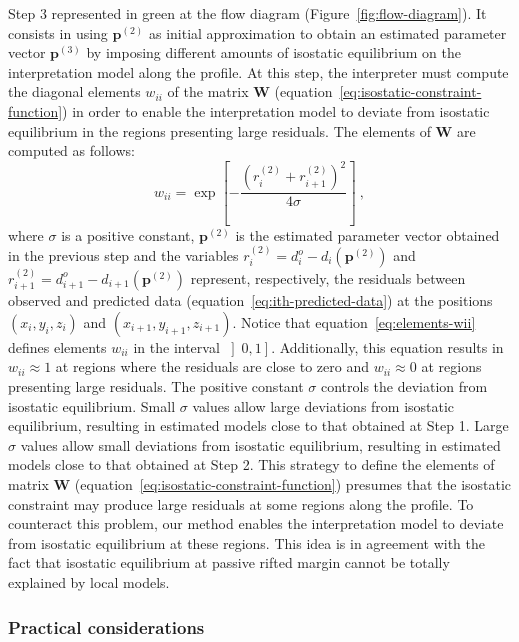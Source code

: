 \documentclass[manuscript]{geophysics}
\begin{document}
Step 3 represented in green at the flow diagram (Figure~\ref{fig:flow-diagram}). 
It consists in using $\mathbf{p}^{(2)}$ as initial 
approximation to obtain an estimated parameter vector $\mathbf{p}^{(3)}$
by imposing different amounts of isostatic equilibrium on the interpretation model along the
profile. At this step, the interpreter must compute the diagonal elements 
$w_{ii}$ of the matrix $\mathbf{W}$ (equation~\ref{eq:isostatic-constraint-function}) 
in order to enable the interpretation model to deviate from isostatic equilibrium in 
the regions presenting large residuals. 
The elements of $\mathbf{W}$ are computed as follows:
\begin{equation} \label{eq:elements-wii}
w_{ii} = 
\exp \left[ - \frac{ \left( r_{i}^{(2)} + r_{i+1}^{(2)} \right)^{2}}{4 \sigma} \right] \: ,
\end{equation}
where $\sigma$ is a positive constant, $\mathbf{p}^{(2)}$ is the estimated parameter vector
obtained in the previous step and the variables
$r_{i}^{(2)} = d^{o}_{i} - d_{i} \left( \mathbf{p}^{(2)} \right)$ and 
$r_{i+1}^{(2)} = d^{o}_{i+1} - d_{i+1} \left(\mathbf{p}^{(2)} \right)$ represent,
respectively, the residuals between observed and predicted data
(equation~\ref{eq:ith-predicted-data}) at the positions $(x_{i}, y_{i}, z_{i})$ and 
$(x_{i+1}, y_{i+1}, z_{i+1})$. Notice that equation~\ref{eq:elements-wii} defines elements 
$w_{ii}$ in the interval $\left] 0, 1 \right]$. Additionally, this equation results in 
$w_{ii} \approx 1$ at regions where the residuals are close to zero and 
$w_{ii} \approx 0$ at regions presenting large residuals.
The positive constant $\sigma$ controls the deviation from isostatic equilibrium.
Small $\sigma$ values allow large deviations from isostatic equilibrium,
resulting in estimated models close to that obtained at Step 1.
Large $\sigma$ values allow small deviations from isostatic equilibrium,
resulting in estimated models close to that obtained at Step 2.
This strategy to define the elements of matrix $\mathbf{W}$ 
(equation~\ref{eq:isostatic-constraint-function}) presumes that the isostatic constraint may
produce large residuals at some regions along the profile. To counteract this problem,
our method enables the interpretation model to deviate from isostatic equilibrium at these 
regions. This idea is in agreement with the fact that isostatic equilibrium at 
passive rifted margin cannot be totally explained by local models.

\subsubsection*{Practical considerations}
\end{document}
